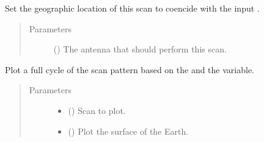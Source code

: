 \documentclass[letterpaper,10pt,english]{sphinxmanual}
\begin{document}
\begin{fulllineitems}

\begin{fulllineitems}
\label{\detokenize{modules/radar_scans:radar_scans.RadarScan.set_tx_location}}
Set the geographic location of this scan to coencide with the input {\hyperref[\detokenize{modules/antenna:antenna.AntennaTX}]{}}.
\begin{quote}\begin{description}
\item[{Parameters}] \leavevmode
{} ({\hyperref[\detokenize{modules/antenna:antenna.AntennaTX}]{}}) \textendash{} The antenna that should perform this scan.

\end{description}\end{quote}

\end{fulllineitems}


\end{fulllineitems}


\begin{fulllineitems}
\label{\detokenize{modules/radar_scans:radar_scans.plot_radar_scan}}
Plot a full cycle of the scan pattern based on the  and the  variable.
\begin{quote}\begin{description}
\item[{Parameters}] \leavevmode\begin{itemize}
\item {} 
 ({\hyperref[\detokenize{modules/radar_scans:radar_scans.RadarScan}]{}}) \textendash{} Scan to plot.

\item {} 
 () \textendash{} Plot the surface of the Earth.

\end{itemize}

\end{description}\end{quote}

\end{fulllineitems}
\end{document}
